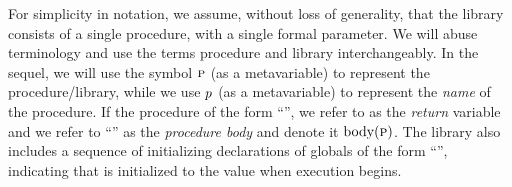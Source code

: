 For simplicity in notation, we assume, without loss of generality,
that the library consists of a single procedure, with a single formal
parameter. We will abuse terminology and use the terms procedure and library interchangeably.
In the sequel, we will use the symbol $\textsc{p}$ (as a metavariable) to represent the procedure/library,
while we use $p$ (as a metavariable) to represent the \emph{name} of the procedure.
If the procedure of the form ``'', we refer to  as the \emph{return}
variable and we refer to ``'' as the \emph{procedure body} and denote it $\text{body}(\textsc{p})$.
The library also includes a sequence of initializing declarations of globals of the form ``'', indicating
that  is initialized to the value  when execution begins.
